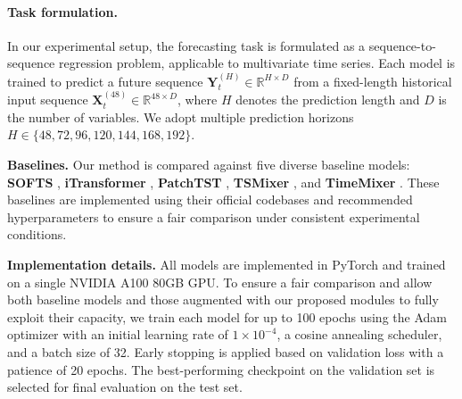 \documentclass{article}
\begin{document}
\paragraph{Task formulation.} 
In our experimental setup, the forecasting task is formulated as a sequence-to-sequence regression problem, applicable to multivariate time series. Each model is trained to predict a future sequence \( \boldsymbol{Y}_{t}^{(H)} \in \mathbb{R}^{H \times D} \) from a fixed-length historical input sequence \( \boldsymbol{X}_{t}^{(48)} \in \mathbb{R}^{48 \times D} \), where \( H \) denotes the prediction length and \( D \) is the number of variables. We adopt multiple prediction horizons \( H \in \{48, 72, 96, 120, 144, 168, 192\} \).


\textbf{Baselines.} Our method is compared against five diverse baseline models: \textbf{SOFTS} \citep{softs}, \textbf{iTransformer} \citep{itransformer}, \textbf{PatchTST} \citep{PatchTST}, \textbf{TSMixer} \citep{tsmixer}, and \textbf{TimeMixer} \citep{timemixer}. These baselines are implemented using their official codebases and recommended hyperparameters to ensure a fair comparison under consistent experimental conditions.


\textbf{Implementation details.} 
All models are implemented in PyTorch and trained on a single NVIDIA A100 80GB GPU. To ensure a fair comparison and allow both baseline models and those augmented with our proposed modules to fully exploit their capacity, we train each model for up to 100 epochs using the Adam optimizer with an initial learning rate of \(1 \times 10^{-4}\), a cosine annealing scheduler, and a batch size of 32. Early stopping is applied based on validation loss with a patience of 20 epochs. The best-performing checkpoint on the validation set is selected for final evaluation on the test set.
\end{document}
